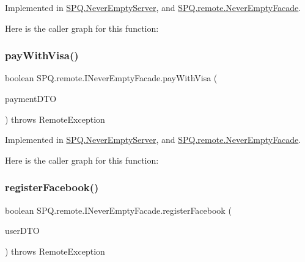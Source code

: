 Implemented in \mbox{\hyperlink{class_s_p_q_1_1_never_empty_server_a954ea8c563055eae79564b357e557f85}{S\+P\+Q.\+Never\+Empty\+Server}}, and \mbox{\hyperlink{class_s_p_q_1_1remote_1_1_never_empty_facade_a9942c7930b5144f0677dc0fdcde25cc3}{S\+P\+Q.\+remote.\+Never\+Empty\+Facade}}.

Here is the caller graph for this function\+:
\mbox{\label{interface_s_p_q_1_1remote_1_1_i_never_empty_facade_a3b7058d95e7b73bdcc09220ecfc2d744}} 
\subsubsection{\texorpdfstring{pay\+With\+Visa()}{payWithVisa()}}
{\footnotesize\ttfamily boolean S\+P\+Q.\+remote.\+I\+Never\+Empty\+Facade.\+pay\+With\+Visa (\begin{DoxyParamCaption}\item[{\mbox{\hyperlink{class_s_p_q_1_1dto_1_1_payment_d_t_o}{Payment\+D\+TO}}}]{payment\+D\+TO }\end{DoxyParamCaption}) throws Remote\+Exception}



Implemented in \mbox{\hyperlink{class_s_p_q_1_1_never_empty_server_a455fa773e66917007842f9a92243ffa8}{S\+P\+Q.\+Never\+Empty\+Server}}, and \mbox{\hyperlink{class_s_p_q_1_1remote_1_1_never_empty_facade_a0ff9201cf33cb76c43dd85c892af93ba}{S\+P\+Q.\+remote.\+Never\+Empty\+Facade}}.

Here is the caller graph for this function\+:
\mbox{\label{interface_s_p_q_1_1remote_1_1_i_never_empty_facade_a7b2f025522489fe9070d09a4fb08f0a1}} 
\subsubsection{\texorpdfstring{register\+Facebook()}{registerFacebook()}}
{\footnotesize\ttfamily boolean S\+P\+Q.\+remote.\+I\+Never\+Empty\+Facade.\+register\+Facebook (\begin{DoxyParamCaption}\item[{\mbox{\hyperlink{class_s_p_q_1_1dto_1_1_user_d_t_o}{User\+D\+TO}}}]{user\+D\+TO }\end{DoxyParamCaption}) throws Remote\+Exception}



